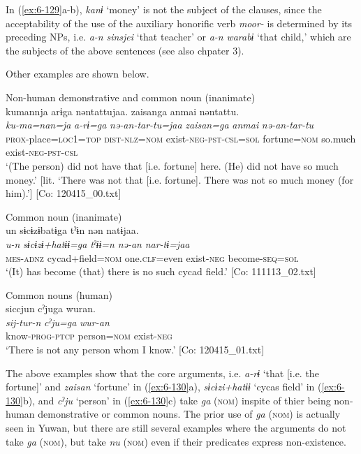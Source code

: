 In (\ref{ex:6-129}a-b), \textit{kanɨ} ‘money’ is not the subject of the clauses, since the acceptability of the use of the auxiliary honorific verb \textit{moor-} is determined by its preceding NPs, i.e. \textit{a-n} \textit{sinsjei} ‘that teacher’ or \textit{a-n} \textit{warabɨ} ‘that child,’ which are the subjects of the above sentences (see also chpater 3).

Other examples are shown below.

\ea\label{ex:6-130}
 Non-human demonstrative and common noun (inanimate)\\
 \ea
 {\TM}
 \glll kumannja  arɨga  nəntattujaa.    {\textbar}zaisan{\textbar}ga  anmai  nəntattu.\\
 \textit{ku-ma=nan=ja}  \textit{a-rɨ=ga}  \textit{nə-an-tar-tu=jaa}     \textit{zaisan=ga}  \textit{anmai}  \textit{nə-an-tar-tu}\\
\textsc{prox}-place=\textsc{loc1}=\textsc{top}  \textsc{dist}-\textsc{nlz}=\textsc{nom}  exist-\textsc{neg}-\textsc{pst}-\textsc{csl}=\textsc{sol}   fortune=\textsc{nom}  so.much  exist-\textsc{neg}-\textsc{pst}-\textsc{csl}\\
\glt ‘(The person) did not have that [i.e. fortune] here. (He) did not have so much money.’ [lit. ‘There was not that [i.e. fortune]. There was not so much money (for him).’]       [Co: 120415\_00.txt]

Common noun (inanimate)\\

\ex
{\TM}
\glll un  sɨcɨzɨbatɨga  tˀɨn  nən  natɨjaa.\\
\textit{u-n}  \textit{sɨcɨzɨ+hatɨɨ=ga}  \textit{tˀɨɨ=n}  \textit{nə-an}     \textit{nar-tɨ=jaa}\\
\textsc{mes}-\textsc{adnz}  cycad+field=\textsc{nom}  one.\textsc{clf}=even  exist-\textsc{neg}  become-\textsc{seq}=\textsc{sol}\\
\glt ‘(It) has become (that) there is no such cycad field.’ [Co: 111113\_02.txt]

Common nouns (human)\\

\ex
{\TM}
\glll siccjun  cˀjuga  wuran.\\
\textit{sij-tur-n}  \textit{cˀju=ga}  \textit{wur-an}\\
know-\textsc{prog}-\textsc{ptcp}  person=\textsc{nom}  exist-\textsc{neg}\\
\glt ‘There is not any person whom I know.’ [Co: 120415\_01.txt]
\z
\z

The above examples show that the core arguments, i.e. \textit{a-rɨ} ‘that [i.e. the fortune]’ and \textit{zaisan} ‘fortune’ in (\ref{ex:6-130}a), \textit{sɨcɨzi+hatɨɨ} ‘cycas field’ in (\ref{ex:6-130}b), and \textit{cˀju} ‘person’ in (\ref{ex:6-130}c) take \textit{ga} (\textsc{nom}) inspite of thier being non-human demonstrative or common nouns. The prior use of \textit{ga} (\textsc{nom}) is actually seen in Yuwan, but there are still several examples where the arguments do not take \textit{ga} (\textsc{nom}), but take \textit{nu} (\textsc{nom}) even if their predicates express non-existence.

